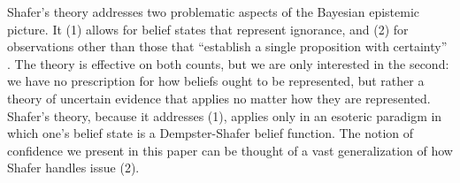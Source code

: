 Shafer's theory addresses two problematic aspects of the Bayesian
epistemic picture. It (1) allows for belief states that represent ignorance,
and (2) for observations other than those that 
``establish a single proposition with certainty''
\parencite[Chapter 1: \S7,\S8]{shafer1976mathematical}.
The theory is effective on both counts, but we are only interested in the second:
we have no prescription for how beliefs ought to be represented, but rather
a theory of uncertain evidence that applies no matter how they are represented.
%
Shafer's theory, because it addresses (1), applies only in an
esoteric paradigm in which 
one's belief state is a Dempster-Shafer belief function. 
The notion of confidence we present in this paper
can be thought of a vast
generalization of how Shafer handles issue (2).

